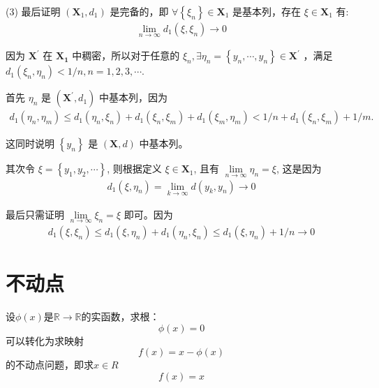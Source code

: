 \begin{solution}
    (3) 最后证明 $\left(\mathbf{X}_1, d_1\right)$ 是完备的，即 $\forall\left\{\xi_n\right\} \in \mathbf{X}_1$ 是基本列，存在 $\xi \in \mathbf{X}_1$ 有:
    \begin{align*}
        \lim\limits_{n \rightarrow \infty} d_1\left(\xi, \xi_n\right) \rightarrow 0
    \end{align*}

    因为 $\mathbf{X}^{\prime}$ 在 $\mathbf{X}_{\mathbf{1}}$ 中稠密，所以对于任意的 $\xi_n, \exists \eta_n=\left\{y_n, \cdots, y_n\right\} \in \mathbf{X}^{\prime}$ ，满足 $d_1\left(\xi_n, \eta_n\right)<1 / n, n=1,2,3, \cdots$.

    首先 $\eta_n$ 是 $\left(\mathbf{X}^{\prime}, d_1\right)$ 中基本列，因为
    \begin{align*}
        d_1\left(\eta_n, \eta_m\right) \leq d_1\left(\eta_n, \xi_n\right)+d_1\left(\xi_n, \xi_m\right)+d_1\left(\xi_m, \eta_m\right)<1 / n+d_1\left(\xi_n, \xi_m\right)+1 / m \text {. }
    \end{align*}

    这同时说明 $\left\{y_n\right\}$ 是 $(\mathbf{X}, d)$ 中基本列。
    
    其次令 $\xi=\left\{y_1, y_2, \cdots\right\}$, 则根据定义 $\xi \in \mathbf{X}_1$, 且有 $\lim\limits_{n \rightarrow \infty} \eta_n=\xi$, 这是因为
    \begin{align*}
        d_1\left(\xi, \eta_n\right)=\lim\limits_{k \rightarrow \infty} d\left(y_k, y_n\right) \rightarrow 0
    \end{align*}

    最后只需证明 $\lim\limits_{n \rightarrow \infty} \xi_n=\xi$ 即可。因为
    \begin{align*}
        d_1\left(\xi, \xi_n\right) \leq d_1\left(\xi, \eta_n\right)+d_1\left(\eta_n, \xi_n\right) \leq d_1\left(\xi, \eta_n\right)+1 / n \rightarrow 0
    \end{align*}
\end{solution}

\section{不动点}
设$\phi(x)$是$\mathbb{R}\to \mathbb{R}$的实函数，求根：
\begin{equation}
    \phi(x) = 0
\end{equation}
可以转化为求映射
\begin{equation}
    f(x) = x - \phi(x)
\end{equation}
的不动点问题，即求$x\in R$
\begin{equation}
    f(x) = x
\end{equation}

